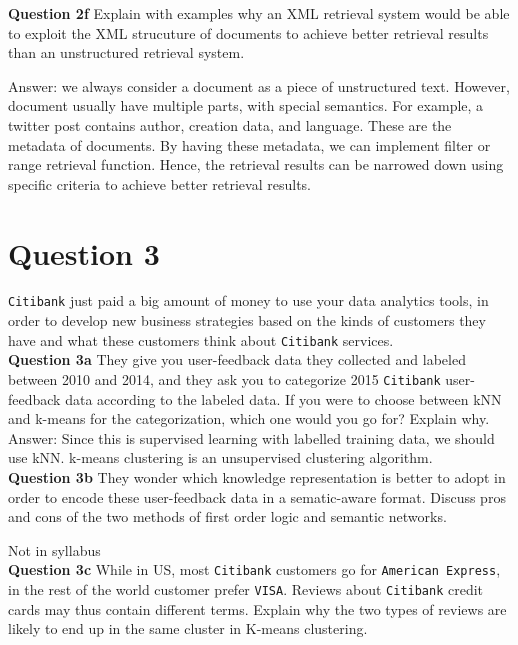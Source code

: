 \documentclass[11pt,a4paper]{report}
\begin{document}
\begin{multicols*}{2}
\noindent \textbf{Question 2f} Explain with examples why an XML retrieval system would be able to exploit the XML strucuture of documents to achieve better retrieval results than an unstructured retrieval system. 

\noindent Answer: we always consider a document as a piece of unstructured text. However, document usually have multiple parts, with special semantics. For example, a twitter post contains author, creation data, and language. These are the metadata of documents. By having these metadata, we can implement filter or range retrieval function. Hence, the retrieval results can be narrowed down using specific criteria to achieve better retrieval results. 

\section{Question 3}

\verb|Citibank| just paid a big amount of money to use your data analytics tools, in order to develop new business strategies based on the kinds of customers they have and what these customers think about \verb|Citibank| services.\\

\noindent \textbf{Question 3a} They give you user-feedback data they collected and labeled between 2010 and 2014, and they ask you to categorize 2015 \verb|Citibank| user-feedback data according to the labeled data. If you were to choose between kNN and k-means for the categorization, which one would you go for? Explain why. 
\noindent Answer: Since this is supervised learning with labelled training data, we should use kNN. k-means clustering is an unsupervised clustering algorithm. \\

\noindent \textbf{Question 3b} They wonder which knowledge representation is better to adopt in order to encode these user-feedback data in a sematic-aware format. Discuss pros and cons of the two methods of first order logic and semantic networks. 

\noindent Not in syllabus \\

\noindent \textbf{Question 3c} While in US, most \verb|Citibank| customers go for \verb|American Express|, in the rest of the world customer prefer \verb|VISA|. Reviews about \verb|Citibank| credit cards may thus contain different terms. Explain why the two types of reviews are likely to end up in the same cluster in K-means clustering.


\end{multicols*}
\end{document}

